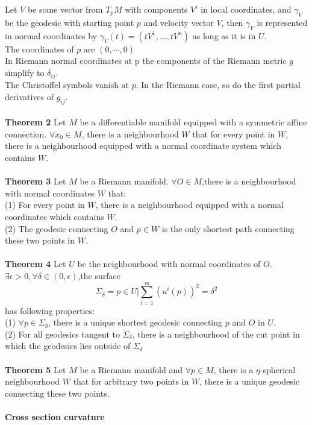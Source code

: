 \documentclass{article}
\begin{document}
Let $V$ be some vector from $T_pM$ with components $V^i$ in local coordinates, and $\gamma_V$ be the geodesic with starting point $p$ and velocity vector $V$, then $\gamma_V$ is represented in normal coordinates by $\gamma _{V}(t)=(tV^{1},...,tV^{n})$ as long as it is in $U$.\\
    The coordinates of $p$ are $(0, \cdots, 0)$\\
    In Riemann normal coordinates at p the components of the Riemann metric $g$ simplify to $\delta _{ij}$.\\
    The Christoffel symbols vanish at $p$. In the Riemann case, so do the first partial derivatives of $g_{ij}$.\\ \\
\textbf{Theorem 2} Let $M$ be a differentiable manifold equipped with a symmetric affine connection. $\forall x_0 \in M$, there is a neighbourhood $W$ that for every point in $W$, there is a neighbourhood equipped with a normal coordinate system which contains $W$. \\ \\
\textbf{Theorem 3} Let $M$ be a Riemann manifold. $\forall O \in M$,there is a neighbourhood with normal coordinates $W$ that:\\
(1) For every point in $W$, there is a neighbourhood equipped with a normal coordinates which contains $W$.\\
(2) The geodesic connecting $O$ and $p \in W$ is the only shortest path connecting these two points in $W$.\\ \\
\textbf{Theorem 4} Let $U$ be the neighbourhood with normal coordinates of $O$. $\exists \epsilon >0, \forall \delta \in (0,\epsilon)$,the surface
\[\Sigma_{\delta} = {p \in U | \sum_{i=1}^{m}} (u^i(p))^2 = \delta^2\]
has following properties:\\
(1) $\forall p \in \Sigma_{\delta}$, there is a unique shortest geodesic connecting $p$ and $O$ in $U$.\\
(2) For all geodesics tangent to $\Sigma_{\delta}$, there is a neighbourhood of the cut point in which the geodesics lies outside of $\Sigma_{\delta}$ \\ \\
\textbf{Theorem 5} Let $M$ be a Riemann manifold and $\forall p \in M$, there is a $\eta$-spherical neighbourhood $W$ that for arbitrary two points in $W$, there is a unique geodesic connecting these two points.\\ \\
\textbf{Cross section curvature} \\
\end{document}

